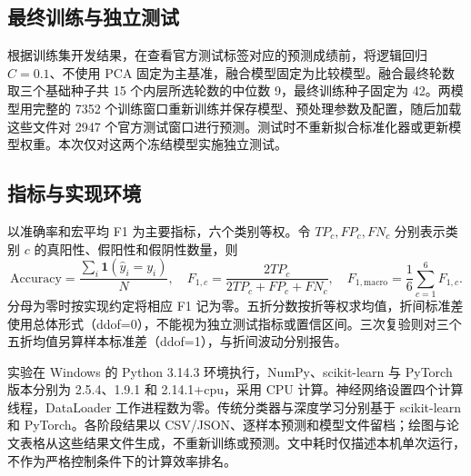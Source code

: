 \subsection{最终训练与独立测试}
根据训练集开发结果，在查看官方测试标签对应的预测成绩前，将逻辑回归 $C=0.1$、不使用 PCA 固定为主基准，融合模型固定为比较模型。融合最终轮数取三个基础种子共 15 个内层所选轮数的中位数 9，最终训练种子固定为 42。两模型用完整的 7352 个训练窗口重新训练并保存模型、预处理参数及配置，随后加载这些文件对 2947 个官方测试窗口进行预测。测试时不重新拟合标准化器或更新模型权重。本次仅对这两个冻结模型实施独立测试。

\subsection{指标与实现环境}
以准确率和宏平均 F1 为主要指标，六个类别等权。令 $TP_c,FP_c,FN_c$ 分别表示类别 $c$ 的真阳性、假阳性和假阴性数量，则
\begin{equation}
 \mathrm{Accuracy}=\frac{\sum_i\mathbf1(\widehat y_i=y_i)}{N},\quad
 F_{1,c}=\frac{2TP_c}{2TP_c+FP_c+FN_c},\quad
 F_{1,\mathrm{macro}}=\frac16\sum_{c=1}^{6}F_{1,c}.
\end{equation}
分母为零时按实现约定将相应 F1 记为零。五折分数按折等权求均值，折间标准差使用总体形式（ddof=0），不能视为独立测试指标或置信区间。三次复验则对三个五折均值另算样本标准差（ddof=1），与折间波动分别报告。

实验在 Windows 的 Python 3.14.3 环境执行，NumPy、scikit-learn 与 PyTorch 版本分别为 2.5.4、1.9.1 和 2.14.1+cpu，采用 CPU 计算。神经网络设置四个计算线程，DataLoader 工作进程数为零。传统分类器与深度学习分别基于 scikit-learn\cite{sklearn2011}和 PyTorch\cite{pytorch2019}。各阶段结果以 CSV/JSON、逐样本预测和模型文件留档；绘图与论文表格从这些结果文件生成，不重新训练或预测。文中耗时仅描述本机单次运行，不作为严格控制条件下的计算效率排名。

